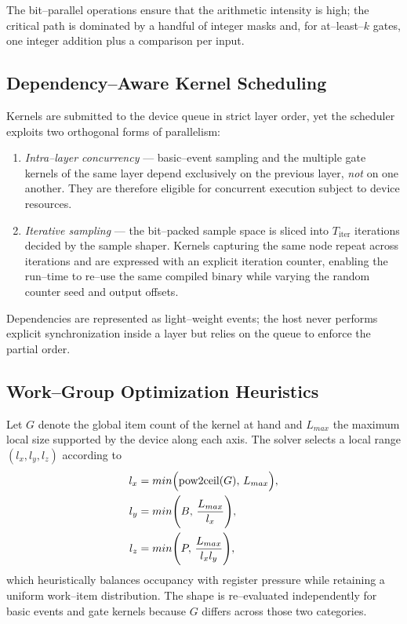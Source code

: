 The bit--parallel operations ensure that the arithmetic intensity is high; the
critical path is dominated by a handful of integer masks and, for
at--least--$k$ gates, one integer addition plus a comparison per input.

\subsection{Dependency--Aware Kernel Scheduling}
\label{subsec:scheduling}

Kernels are submitted to the device queue in strict layer order, yet the
scheduler exploits two orthogonal forms of parallelism:
\begin{enumerate}
  \item \emph{Intra--layer concurrency} --- basic--event sampling and the
        multiple gate kernels of the same layer depend exclusively on the
        previous layer, \emph{not} on one another.  They are therefore eligible
        for concurrent execution subject to device resources.
  \item \emph{Iterative sampling} --- the bit--packed sample space is sliced
        into $T_\text{iter}$ iterations decided by the sample shaper.
        Kernels capturing the same node repeat across iterations and are
        expressed with an explicit iteration counter, enabling the run--time to
        re--use the same compiled binary while varying the random counter seed
        and output offsets.
\end{enumerate}
Dependencies are represented as light--weight events; the host never performs
explicit synchronization inside a layer but relies on the queue to enforce the
partial order.

\subsection{Work--Group Optimization Heuristics}
\label{subsec:wg_optim}

Let $G$ denote the global item count of the kernel at hand and $L_{max}$ the
maximum local size supported by the device along each axis.  The solver
selects a local range $(l_x,l_y,l_z)$ according to
\begin{align*}
  l_x &= min\Bigl(\text{pow2ceil}(G),\,L_{max}\Bigr),\\
  l_y &= min\Biggl(B,\,\frac{L_{max}}{l_x}\Biggr),\\
  l_z &= min\Biggl(P,\,\frac{L_{max}}{l_x l_y}\Biggr),
\end{align*}
which heuristically balances occupancy with register pressure while retaining a
uniform work--item distribution.  The shape is re--evaluated independently for
basic events and gate kernels because $G$ differs across those two categories.

